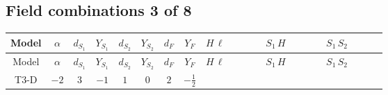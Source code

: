 \documentclass[8pt]{article}
\begin{document}
\begin{landscape}
\subsection*{Field combinations 3 of 8}
\begin{longtable}{@{}cccccccc >{\raggedright\arraybackslash}p{0.21\linewidth} >{\raggedright\arraybackslash}p{0.21\linewidth} >{\raggedright\arraybackslash}p{0.21\linewidth}@{}}
\toprule
Model & $\alpha$ & $d_{S_1}$ & $Y_{S_1}$ & $d_{S_2}$ & $Y_{S_2}$ & $d_F$ & $Y_F$ & $H\,\ell$ & $S_1\,H$ & $S_1\,S_2$ \\
\midrule
\endfirsthead
\toprule
Model & $\alpha$ & $d_{S_1}$ & $Y_{S_1}$ & $d_{S_2}$ & $Y_{S_2}$ & $d_F$ & $Y_F$ & $H\,\ell$ & $S_1\,H$ & $S_1\,S_2$ \\
\midrule
\endhead
T3-D & $-2$ & $3$ & $-1$ & $1$ & $0$ & $2$ & $-\frac{1}{2}$ & \scriptsize\adjustbox{max width=\linewidth}{$\begin{gathered} +\frac{2 \hbar  \overline{y_{1,i_1,r_1}} \overline{y_{2,i_2,r_1}} L_{a_4,i_2}{}^T\, C\, P_L\, L_{a_2,i_1} H_{a_1} H_{a_3} \lambda_5 \epsilon_{a_1,a_2} \epsilon_{a_3,a_4}}{\sqrt{3} \epsilon  M_F} \\ +\frac{2 \hbar  \overline{y_{1,i_1,r_1}} \overline{y_{2,i_2,r_1}} L_{a_4,i_2}{}^T\, C\, P_L\, L_{a_2,i_1} H_{a_1} H_{a_3} \lambda_5 \epsilon_{a_1,a_2} \epsilon_{a_3,a_4}}{\sqrt{3} M_F} \\ +\frac{2 \hbar  \overline{\lambda_5} \overline{L_{a_3,i_1}}\, C\, P_R\, \overline{L_{a_4,i_2}}{}^T y_{1,i_1,r_1} y_{2,i_2,r_1} \epsilon_{a_1,a_3} \epsilon_{a_2,a_4} H_{a_1}{}^{\dagger } H_{a_2}{}^{\dagger }}{\sqrt{3} \epsilon  M_F}\end{gathered}$} & \scriptsize\adjustbox{max width=\linewidth}{$\begin{gathered} -\frac{2 \hbar  \overline{y_{1,i_1,r_1}} \overline{Y_{e,i_2,i_3}} H_{a_1} S_{1,j_1} y_{1,i_2,r_1} Y_{e,i_1,i_3} H_{a_1}{}^{\dagger } S_{1,j_1}{}^{\dagger }}{\sqrt{3} \epsilon } \\ -\frac{2 \hbar  \overline{y_{1,i_1,r_1}} \overline{Y_{e,i_2,i_3}} H_{a_1} S_{1,j_1} y_{1,i_2,r_1} Y_{e,i_1,i_3} H_{a_1}{}^{\dagger } S_{1,j_1}{}^{\dagger }}{\sqrt{3}} \\ +\frac{2 i \sqrt{\frac{2}{3}} \hbar  \overline{y_{1,i_1,r_1}} \overline{Y_{e,i_2,i_3}} H_{a_2} S_{1,j_2} y_{1,i_2,r_1} Y_{e,i_1,i_3} H_{a_1}{}^{\dagger } S_{1,j_1}{}^{\dagger } \mathcal{I}_{H1,a_1,a_2,j_1,j_2}{}^1}{\epsilon }\end{gathered}$} & \scriptsize\adjustbox{max width=\linewidth}{$\begin{gathered} -\frac{4 \hbar  \overline{y_{1,i_1,r_1}} \overline{y_{2,i_2,r_2}} S_2 S_{1,j_1} y_{1,i_2,r_1} y_{2,i_1,r_2} S_2{}^{\dagger } S_{1,j_1}{}^{\dagger }}{\sqrt{3} \epsilon } \\ +\frac{4 \hbar  \overline{y_{1,i_1,r_1}} \overline{y_{2,i_2,r_1}} S_2 S_{1,j_1} y_{1,i_2,r_2} y_{2,i_1,r_2} S_2{}^{\dagger } S_{1,j_1}{}^{\dagger }}{\sqrt{3}} \\ +\frac{4 \hbar  \overline{y_{1,i_1,r_1}} \overline{y_{2,i_2,r_1}} S_2 S_{1,j_1} y_{1,i_1,r_2} y_{2,i_2,r_2} S_2{}^{\dagger } S_{1,j_1}{}^{\dagger }}{\sqrt{3}}\end{gathered}$} \\

\end{longtable}
\end{landscape}
\end{document}
